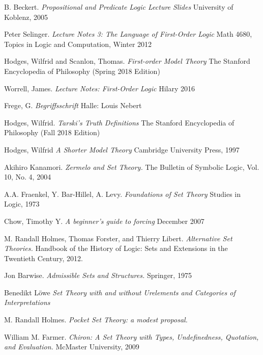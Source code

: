 \documentclass[11pt]{article}
\theoremstyle{definition}
\theoremstyle{theorem}
\theoremstyle{lemma}
\begin{document}
\begin{thebibliography}{9}
B. Beckert.
\textit{Propositional and Predicate Logic Lecture Slides}
University of Koblenz, 2005

Peter Selinger.
\textit{Lecture Notes 3: The Language of First-Order Logic}
Math 4680, Topics in Logic and Computation, Winter 2012

Hodges, Wilfrid and Scanlon, Thomas.
\textit{First-order Model Theory}
The Stanford Encyclopedia of Philosophy (Spring 2018 Edition)

Worrell, James.
\textit{Lecture Notes: First-Order Logic}
Hilary 2016

Frege, G.
\textit{Begriffsschrift}
Halle: Louis Nebert

Hodges, Wilfrid.
\textit{Tarski's Truth Definitions}
The Stanford Encyclopedia of Philosophy (Fall 2018 Edition)

Hodges, Wilfrid
\textit{A Shorter Model Theory}
Cambridge University Press, 1997

Akihiro Kanamori.
\textit{Zermelo and Set Theory.}
The Bulletin of Symbolic Logic, Vol. 10, No. 4, 2004

A.A. Fraenkel, Y. Bar-Hillel, A. Levy.
\textit{Foundations of Set Theory}
Studies in Logic, 1973

Chow, Timothy Y.
\textit{A beginner's guide to forcing}
December 2007

M. Randall Holmes, Thomas Forster, and Thierry Libert.
\textit{Alternative Set Theories.}
Handbook of the History of Logic: Sets and Extensions in the Twentieth Century, 2012.

Jon Barwise.
\textit{Admissible Sets and Structures.}
Springer, 1975

Benedikt L\"owe
\textit{Set Theory with and without Urelements and Categories of Interpretations}

M. Randall Holmes.
\textit{Pocket Set Theory: a modest proposal.}

William M. Farmer.
\textit{Chiron: A Set Theory with Types,
Undefinedness, Quotation, and Evaluation.}
McMaster University, 2009

\end{thebibliography}
\end{document}
